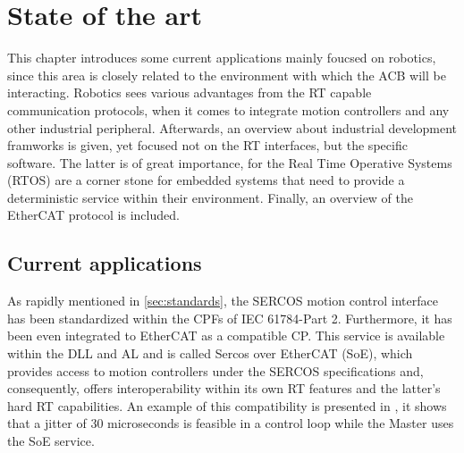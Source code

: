 \chapter{State of the art}\label{cha:state}
%
%  
%

This chapter introduces some current applications mainly foucsed on robotics, since this area is closely
related to the environment with which the ACB will be interacting. Robotics sees various advantages
from the RT capable communication protocols, when it comes to integrate motion controllers and 
any other industrial peripheral. Afterwards, an overview about industrial development framworks is 
given, yet focused not on the RT interfaces, but the specific software. The latter is of great importance,
for the Real Time Operative Systems (RTOS) are a corner stone for embedded systems that need to provide a 
deterministic service within their environment. Finally, an overview of the EtherCAT protocol is included.


\section{Current applications}\label{sec:applications}

As rapidly mentioned in \ref{sec:standards}, the SERCOS motion control interface has been standardized within the 
CPFs of IEC 61784-Part 2. Furthermore, it has been even integrated to EtherCAT as a compatible CP. 
This service is available within the DLL and AL and is called Sercos over EtherCAT (SoE), which provides access to motion controllers under 
the SERCOS specifications and, consequently, offers interoperability within its own RT features and the latter's hard RT capabilities.  
An example of this compatibility is presented in \cite{ecat_sercos}, %
it shows that a jitter of 30 microseconds is feasible in a control loop while the Master uses the SoE service.

